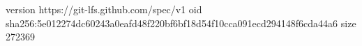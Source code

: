 version https://git-lfs.github.com/spec/v1
oid sha256:5e012274dc60243a0eafd48f220bf6bf18d54f10cca091ecd294148f6cda44a6
size 272369
